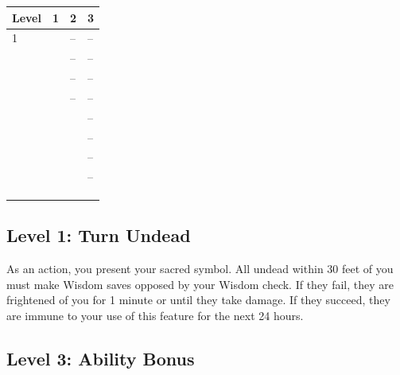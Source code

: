 \documentclass[12pt,letterpaper,twocolumn,openany,nodeprecatedcode,bg=none]{dndbook}
\let\oldsubsection\subsection
\renewcommand{\subsection}[1]{%
  \needspace{5\baselineskip}%
  \oldsubsection{#1}%
}
\begin{document}

{\def\LTcaptype{none} %
\begin{table}[!htbp]
\centering
\begin{tabular}{@{}
  >{\raggedright\arraybackslash}p{}
  >{\raggedright\arraybackslash}p{}
  >{\raggedright\arraybackslash}p{}
  >{\raggedright\arraybackslash}p{}@{}}
\toprule\noalign{}
\begin{minipage}[b]{\linewidth}\raggedright
Level
\end{minipage} & \begin{minipage}[b]{\linewidth}\raggedright
1
\end{minipage} & \begin{minipage}[b]{\linewidth}\raggedright
2
\end{minipage} & \begin{minipage}[b]{\linewidth}\raggedright
3
\end{minipage} \\
\midrule\noalign{}
1 & 2 & -- & -- \\
2 & 2 & -- & -- \\
3 & 3 & -- & -- \\
4 & 3 & -- & -- \\
5 & 4 & 2 & -- \\
6 & 4 & 2 & -- \\
7 & 4 & 3 & -- \\
8 & 4 & 3 & -- \\
9 & 4 & 3 & 2 \\
10 & 4 & 3 & 2 \\
\bottomrule\noalign{}
\end{tabular}
\end{table}
}

\subsection{Level 1: Turn Undead}\label{level-1-turn-undead}

As an action, you present your sacred symbol. All undead within 30 feet
of you must make Wisdom saves opposed by your Wisdom check. If they
fail, they are frightened of you for 1 minute or until they take damage.
If they succeed, they are immune to your use of this feature for the
next 24 hours.

\subsection{Level 3: Ability Bonus}\label{level-3-ability-bonus}
\end{document}
